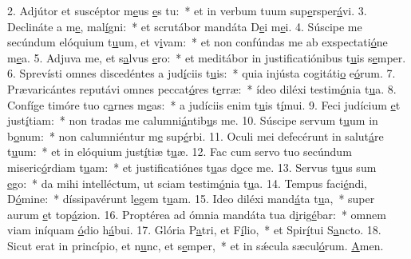 2. Adjútor et suscéptor m\uline{e}us \uline{e}s tu:~* et in verbum tuum sup\uline{e}rsper\uline{á}vi.
3. Declináte a m\uline{e}, mal\uline{í}gni:~* et scrutábor mandáta D\uline{e}i m\uline{e}i.
4. Súscipe me secúndum elóquium t\uline{u}um, et v\uline{i}vam:~* et non confúndas me ab exspectati\uline{ó}ne m\uline{e}a.
5. Adjuva me, et s\uline{a}lvus \uline{e}ro:~* et meditábor in justificatiónibus t\uline{u}is s\uline{e}mper.
6. Sprevísti omnes discedéntes a jud\uline{í}ciis t\uline{u}is:~* quia injústa cogitáti\uline{o} e\uline{ó}rum.
7. Prævaricántes reputávi omnes peccat\uline{ó}res t\uline{e}rræ:~* ídeo diléxi testim\uline{ó}nia t\uline{u}a.
8. Confíge timóre tuo c\uline{a}rnes m\uline{e}as:~* a judíciis enim t\uline{u}is t\uline{í}mui.
9. Feci judícium \uline{e}t just\uline{í}tiam:~* non tradas me calumni\uline{á}ntib\uline{u}s me.
10. Súscipe servum t\uline{u}um in b\uline{o}num:~* non calumniéntur m\uline{e} sup\uline{é}rbi.
11. Oculi mei defecérunt in salut\uline{á}re t\uline{u}um:~* et in elóquium just\uline{í}tiæ t\uline{u}æ.
12. Fac cum servo tuo secúndum miseric\uline{ó}rdiam t\uline{u}am:~* et justificatiónes t\uline{u}as d\uline{o}ce me.
13. Servus t\uline{u}us sum \uline{e}go:~* da mihi intelléctum, ut sciam testim\uline{ó}nia t\uline{u}a.
14. Tempus faci\uline{é}ndi, D\uline{ó}mine:~* díssipavérunt l\uline{e}gem t\uline{u}am.
15. Ideo diléxi mand\uline{á}ta t\uline{u}a,~* super aurum \uline{e}t top\uline{á}zion.
16. Proptérea ad ómnia mandáta tua d\uline{i}rig\uline{é}bar:~* omnem viam iníquam \uline{ó}dio h\uline{á}bui.
17. Glória P\uline{a}tri, et F\uline{í}lio,~* et Spir\uline{í}tui S\uline{a}ncto.
18. Sicut erat in princípio, et n\uline{u}nc, et s\uline{e}mper,~* et in sǽcula sæcul\uline{ó}rum. \uline{A}men.
